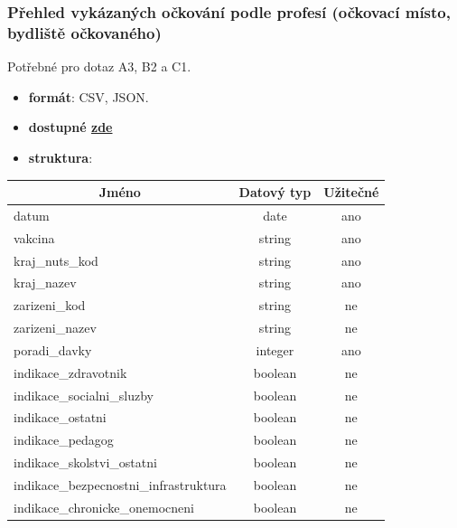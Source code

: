 \documentclass[12pt]{article}
\begin{document}
\subsubsection*{Přehled vykázaných očkování podle profesí (očkovací místo, bydliště očkovaného)}
Potřebné pro dotaz A3, B2 a C1.
\begin{itemize}
    \item \textbf{formát}: CSV, JSON.
    \item \textbf{dostupné \href{https://onemocneni-aktualne.mzcr.cz/api/v2/covid-19/ockovani-profese.csv}{zde}}
    \item \textbf{struktura}:
\end{itemize}
        \begin{center}
            \begin{tabular}{ |l|c|c| }
                \hline
                \multicolumn{1}{|c|}{Jméno} & Datový typ & Užitečné \\
                \hline
                \hline
                datum & date & ano \\
                \hline
                vakcina & string & ano \\
                \hline
                kraj\_nuts\_kod & string & ano \\
                \hline
                kraj\_nazev & string & ano \\
                \hline
                zarizeni\_kod & string & ne \\
                \hline
                zarizeni\_nazev & string & ne \\
                \hline
                poradi\_davky & integer & ano \\
                \hline
                indikace\_zdravotnik & boolean & ne \\
                \hline
                indikace\_socialni\_sluzby & boolean & ne \\
                \hline
                indikace\_ostatni & boolean & ne \\
                \hline
                indikace\_pedagog & boolean & ne \\
                \hline
                indikace\_skolstvi\_ostatni & boolean & ne \\
                \hline
                indikace\_bezpecnostni\_infrastruktura & boolean & ne \\
                \hline
                indikace\_chronicke\_onemocneni & boolean & ne \\

\end{tabular}
\end{center}
\end{document}
